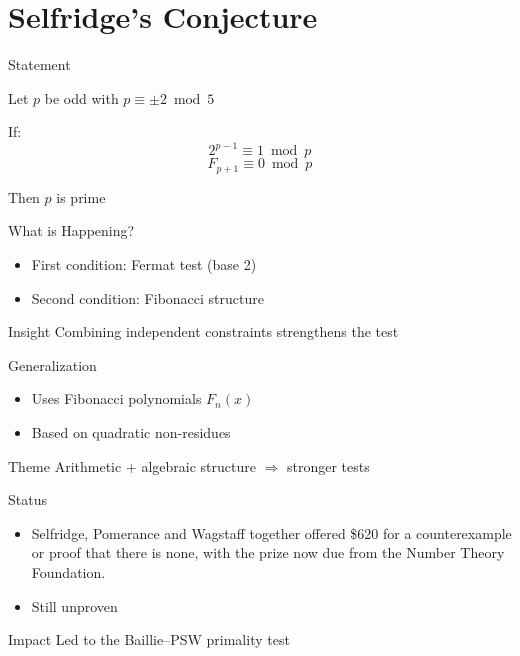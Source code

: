 \documentclass{beamer}
\begin{document}
\section{Selfridge's Conjecture}

\begin{frame}{Statement}

Let $p$ be odd with $p \equiv \pm 2 \bmod 5$


If:
\[
2^{p-1} \equiv 1 \bmod p
\]
\[
F_{p+1} \equiv 0 \bmod p
\]


Then $p$ is prime

\end{frame}


\begin{frame}{What is Happening?}

\begin{itemize}
    \item First condition: Fermat test (base 2)

    \item Second condition: Fibonacci structure
\end{itemize}


\begin{block}{Insight}
Combining independent constraints strengthens the test
\end{block}

\end{frame}


\begin{frame}{Generalization}

\begin{itemize}
    \item Uses Fibonacci polynomials $F_n(x)$

    \item Based on quadratic non-residues
\end{itemize}


\begin{block}{Theme}
Arithmetic + algebraic structure $\Rightarrow$ stronger tests
\end{block}

\end{frame}


\begin{frame}{Status}

\begin{itemize}
    \item Selfridge, Pomerance and Wagstaff together offered \$620 for a counterexample or proof that there is none, with the prize now due from the Number Theory Foundation.
    \item Still unproven
\end{itemize}


\begin{block}{Impact}
Led to the Baillie--PSW primality test
\end{block}

\end{frame}
\end{document}
